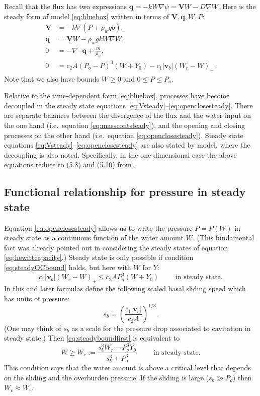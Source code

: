 \documentclass[11pt,final]{amsart}
\newcommand\bv{\mathbf{v}}
\newcommand\bV{\mathbf{V}}
\newcommand\bq{\mathbf{q}}
\newcommand{\Div}{\nabla\cdot}
\newcommand{\grad}{\nabla}
\begin{document}
Recall that the flux has two expressions $\bq = - k W \grad \psi = \bV W - D \grad W$.  Here is the steady form of model \eqref{eq:bluebox} written in terms of $\bV,\bq,W,P$:
\begin{align}
\bV &= - k \grad \left(P + \rho_w g b\right), \label{eq:Vsteady} \\
\bq &= \bV W - \rho_w g k W \grad W, \label{eq:qsteady} \\
0 &= - \Div \bq + \frac{m}{\rho_w}, \label{eq:masscontsteady} \\
0 &= c_2 A (P_o - P)^3 (W+Y_0) - c_1 |\bv_b| (W_r - W)_+. \label{eq:openclosesteady}
\end{align}
Note that we also have bounds $W\ge 0$ and $0 \le P \le P_o$.

Relative to the time-dependent form \eqref{eq:bluebox}, processes have become decoupled in the steady state equations \eqref{eq:Vsteady}--\eqref{eq:openclosesteady}.  There are separate balances between the divergence of the flux and the water input on the one hand (i.e.~equation \eqref{eq:masscontsteady}), and the opening and closing processes on the other hand (i.e.~equation \eqref{eq:openclosesteady}).  Steady state equations \eqref{eq:Vsteady}--\eqref{eq:openclosesteady} are also stated by \cite{Schoofetal2012} model, where the decoupling is also noted.  Specifically, in the one-dimensional case the above equations reduce to (5.8) and (5.10) from \cite{Schoofetal2012}.


\subsection*{Functional relationship for pressure in steady state}  Equation \eqref{eq:openclosesteady} allows us to write the pressure $P=P(W)$ in steady state as a continuous function of the water amount $W$.  (This fundamental fact was already pointed out in considering the steady states of equation \eqref{eq:hewittcapacity}.)  Steady state is only possible if condition \eqref{eq:steadyOCbound} holds, but here with $W$ for $Y$:
\begin{equation}
c_1 |\bv_b| (W_r - W)_+ \le c_2 A P_o^3 (W+Y_0) \qquad \text{ in steady state}. \label{eq:steadyboundfirst}
\end{equation}
In this and later formulas define the following scaled basal sliding speed which has units of pressure:
\begin{equation}
s_b =  \left(\frac{c_1 |\bv_b|}{c_2 A}\right)^{1/3}.  \label{eq:definesb}
\end{equation}
(One may think of $s_b$ as a scale for the pressure drop associated to cavitation in steady state.)  Then \eqref{eq:steadyboundfirst} is equivalent to
\begin{equation}
W \ge W_c := \frac{s_b^3 W_r - P_o^3 Y_0}{s_b^3 + P_o^3} \qquad \text{ in steady state}. \label{eq:steadyboundsecond}
\end{equation}
This condition says that the water amount is above a critical level that depends on the sliding and the overburden pressure.  If the sliding is large ($s_b \gg P_o$) then $W_c\approx W_r$.
\end{document}
